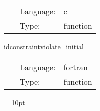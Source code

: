 \documentclass{article}
\begin{document}
\hspace{5mm}{\it check parameters } 


\hspace{5mm}

 \begin{tabular*}{160mm}{cll} 
~ & Language:  & c \\ 
~ & Type:  & function \\ 
\end{tabular*} 


\vspace{5mm}


\hspace{5mm} idconstraintviolate\_initial 

\hspace{5mm}{\it set up constraint violating initial data } 


\hspace{5mm}

 \begin{tabular*}{160mm}{cll} 
~ & Language:  & fortran \\ 
~ & Type:  & function \\ 
\end{tabular*} 



\vspace{5mm}\parskip = 10pt 
\end{document}
